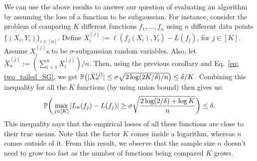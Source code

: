\documentclass[twoside]{article}
\begin{document}
       
    \begin{remark}
      We can use the above results to answer our question of evaluating an algorithm by assuming the loss of a function to be subgaussian. For instance, consider the problem of comparing $K$ different functions $f_1, \ldots, f_n$ using $n$ different data points $\{(X_i, Y_i)\}_{i \in [n]}$. Define $X_i^{(j)} := \ell (f_j(X_i), Y_i) - L(f_j)$, for $j \in [K]$. Assume $X_i^{(j)}$s to be $\sigma$-subgaussian random variables. Also, let $\bar X^{(j)}_n := (\sum_{i=1}^n X_i^{(j)}) / n$. Then, using the previous corollary and Eq.\ \ref{eq: two_tailed_SG}, we get $\mathbb{P} \big( |\bar X^{(j)}_n| \leq \sigma \sqrt{ 2 \log (2K / \delta) / n} \big) \leq \delta/K$. Combining this inequality for all the $K$ functions (by using union bound) then gives us:
      \begin{align*}
        \mathbb{P} \bigg( \max_{j \in [K]} |L_n(f_j) - L(f_j)| \geq \sigma \sqrt{\frac{2 \log(2 / \delta) + \log K}{n}} \bigg) \leq \delta.
      \end{align*}
       This inequality says that the empirical losses of all these functions are close to their true means. Note that the factor $K$ comes inside a logarithm, whereas $n$ comes outside of it. From this result, we observe that the sample size $n$ doesn't need to grow too fast as the number of functions being compared $K$ grows.
    \end{remark}
   
\end{document}
